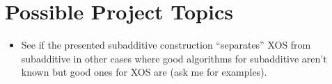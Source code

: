 \section{Possible Project Topics}
\begin{itemize}
\item See if the presented subadditive construction ``separates'' XOS from subadditive in other cases where good algorithms for subadditive aren't known but good ones for XOS are (ask me for examples). 
\end{itemize}





